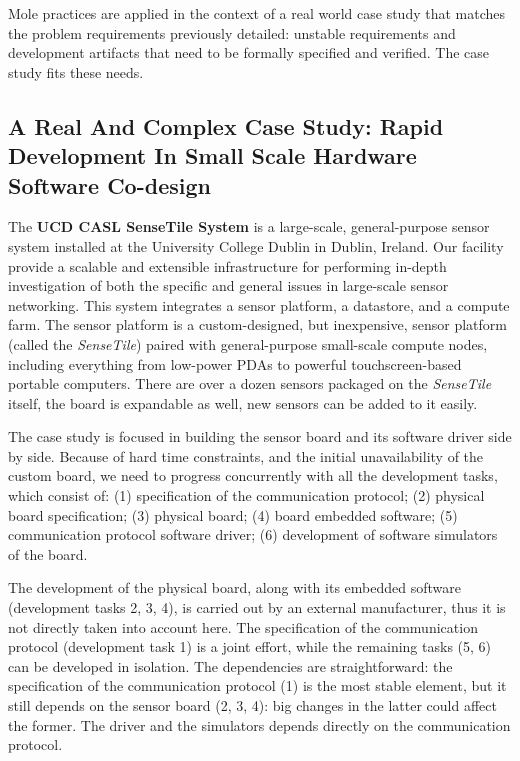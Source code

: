 \documentclass[english]{lni}
\newcommand{\ST}{\emph{SenseTile}\xspace}
\begin{document}
Mole practices are applied in the context of a real world case study that matches the problem requirements previously detailed: unstable requirements and development artifacts that need to be formally specified and verified.
The case study fits these needs.



\subsection{A Real And Complex Case Study: Rapid Development In Small Scale Hardware Software Co-design}
\label{subsec:a_real_and_complex_case_study}

The \textbf{UCD CASL SenseTile System} is a large-scale, general-purpose sensor system installed at the University College Dublin in Dublin, Ireland.
Our facility provide a scalable and extensible infrastructure for performing in-depth investigation of both the specific and general issues in large-scale sensor networking.
This system integrates a sensor platform, a datastore, and a compute farm.  
The sensor platform is a custom-designed, but inexpensive, sensor platform (called the \ST) paired with general-purpose small-scale compute nodes, including everything from low-power PDAs to powerful touchscreen-based portable computers.  
There are over a dozen sensors packaged on the \ST itself, the board is expandable as well, new sensors can be added to it easily.

The case study is focused in building the sensor board and its software driver side by side.
Because of hard time constraints, and the initial unavailability of the custom board, we need to progress concurrently with all the development tasks, which consist of: (1) specification of the communication protocol; (2) physical board specification; (3) physical board; (4) board embedded software; (5) communication protocol software driver; (6) development of software simulators of the board.

The development of the physical board, along with its embedded software (development tasks 2, 3, 4), is carried out by an external manufacturer, thus it is not directly taken into account here. 
The specification of the communication protocol (development task 1) is a joint effort, while the remaining tasks (5, 6) can be developed in isolation.
The dependencies are straightforward: the specification of the communication protocol (1) is the most stable element, but it still depends on the sensor board (2, 3, 4): big changes in the latter could affect the former.
The driver and the simulators depends directly on the communication protocol.
\end{document}
